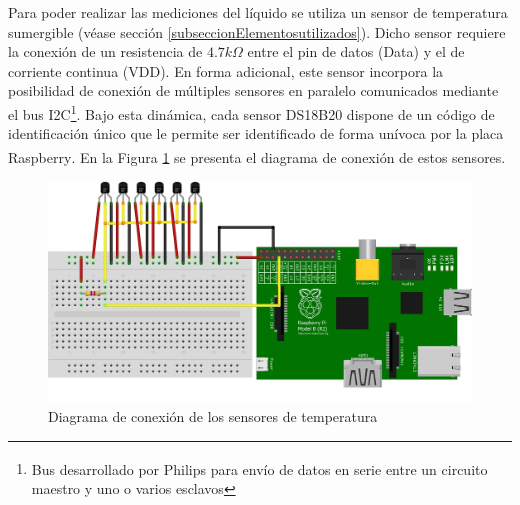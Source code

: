         \par Para poder realizar las mediciones del líquido se utiliza un sensor de temperatura sumergible (véase sección \ref{subseccionElementosutilizados}). Dicho sensor requiere la conexión de un resistencia de $4.7k\Omega$ entre el pin de datos (Data) y el de corriente continua (VDD). En forma adicional, este sensor incorpora la posibilidad de conexión de múltiples sensores en paralelo comunicados mediante el bus I2C\footnote{Bus desarrollado por Philips\textsuperscript{\textregistered} para envío de datos en serie entre un circuito maestro y uno o varios esclavos}. Bajo esta dinámica, cada sensor DS18B20 dispone de un código de identificación único que le permite ser identificado de forma unívoca por la placa Raspberry\textsuperscript{\textregistered}. En la Figura \ref{fig:ConexionTemperatura} se presenta el diagrama de conexión de estos sensores.
        \begin{figure}
            \centering
            \includegraphics[scale = 0.8]{DiagramaSensordeTemp_bb.jpg}
            \caption{Diagrama de conexión de los sensores de temperatura}
            \label{fig:ConexionTemperatura}
        \end{figure}
        
